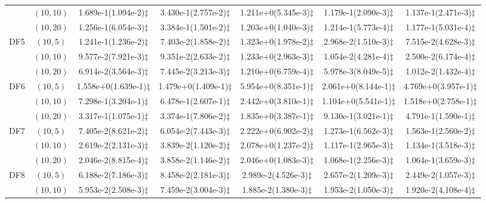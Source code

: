 \documentclass[review]{elsarticle}
\begin{document}
\begin{table*}[!htb]
{\begin{tabular}{ccccccc}
&$(10,10)$ &1.689e-1(1.094e-2)$\ddagger$ &3.430e-1(2.757e-2)$\ddagger$ &1.211e+0(5.345e-3)$\ddagger$ &1.179e-1(2.090e-3)$\ddagger$ &1.137e-1(2.471e-3)$\ddagger$ \\
&$(10,20)$ &1.256e-1(6.054e-3)$\ddagger$ &3.384e-1(1.501e-2)$\ddagger$ &1.203e+0(1.040e-3)$\ddagger$ &1.214e-1(5.773e-4)$\ddagger$ &1.177e-1(5.031e-4)$\ddagger$ \\
\hline  \multirow{3}{*}{DF5}
&$(10,5)$ &1.241e-1(1.236e-2)$\ddagger$ &7.403e-2(1.858e-2)$\ddagger$ &1.323e+0(1.978e-2)$\ddagger$ &2.968e-2(1.510e-3)$\ddagger$ &7.515e-2(4.628e-3)$\ddagger$ \\
&$(10,10)$ &9.577e-2(7.921e-3)$\ddagger$ &9.351e-2(2.633e-2)$\ddagger$ &1.233e+0(2.963e-3)$\ddagger$ &1.054e-2(4.281e-4)$\ddagger$ &2.500e-2(6.174e-4)$\ddagger$ \\
&$(10,20)$ &6.914e-2(3.564e-3)$\ddagger$ &7.445e-2(3.213e-3)$\ddagger$ &1.210e+0(6.759e-4)$\ddagger$ &5.978e-3(8.049e-5)$\ddagger$ &1.012e-2(1.432e-4)$\ddagger$ \\
\hline  \multirow{3}{*}{DF6}
&$(10,5)$ &1.558e+0(1.639e-1)$\ddagger$ &1.479e+0(1.409e-1)$\ddagger$ &5.954e+0(8.351e-1)$\ddagger$ &2.061e+0(8.144e-1)$\ddagger$ &4.769e+0(3.957e-1)$\ddagger$ \\
&$(10,10)$ &7.298e-1(3.204e-1)$\ddagger$ &6.478e-1(2.607e-1)$\ddagger$ &2.442e+0(3.810e-1)$\ddagger$ &1.104e+0(5.541e-1)$\ddagger$ &1.518e+0(2.758e-1)$\ddagger$ \\
&$(10,20)$ &3.317e-1(1.075e-1)$\ddagger$ &3.374e-1(7.806e-2)$\ddagger$ &1.835e+0(3.387e-1)$\ddagger$ &9.130e-1(3.021e-1)$\ddagger$ &4.791e-1(1.590e-1)$\ddagger$ \\
\hline  \multirow{3}{*}{DF7}
&$(10,5)$ &7.405e-2(8.621e-2)$\ddagger$ &6.054e-2(7.443e-3)$\ddagger$ &2.222e+0(6.902e-2)$\ddagger$ &1.273e-1(6.562e-3)$\ddagger$ &1.563e-1(2.560e-2)$\ddagger$ \\
&$(10,10)$ &2.619e-2(2.131e-3)$\ddagger$ &3.839e-2(1.120e-2)$\ddagger$ &2.078e+0(1.237e-2)$\ddagger$ &1.117e-1(2.965e-3)$\ddagger$ &1.134e-1(3.518e-3)$\ddagger$ \\
&$(10,20)$ &2.046e-2(8.815e-4)$\ddagger$ &3.858e-2(1.146e-2)$\ddagger$ &2.046e+0(1.083e-3)$\ddagger$ &1.068e-1(2.256e-3)$\ddagger$ &1.064e-1(3.659e-3)$\ddagger$ \\
\hline  \multirow{3}{*}{DF8}
&$(10,5)$ &6.188e-2(7.186e-3)$\ddagger$ &8.458e-2(2.181e-3)$\ddagger$ &2.989e-2(4.526e-3)$\ddagger$ &2.657e-2(1.209e-3)$\ddagger$ &2.449e-2(1.057e-3)$\ddagger$ \\
&$(10,10)$ &5.953e-2(2.508e-3)$\ddagger$ &7.459e-2(3.004e-3)$\ddagger$ &1.885e-2(1.380e-3)$\ddagger$ &1.953e-2(1.050e-3)$\ddagger$ &1.920e-2(4.108e-4)$\ddagger$ \\

\end{tabular}}
\end{table*}
\end{document}
